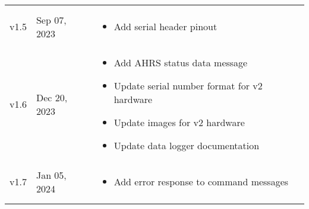 \begin{longtable}{| >{\centering}p{} | p{} | >{\raggedright\arraybackslash}p{} |}
\begin{itemize}
        \end{itemize}\\
        v1.5 & Sep 07, 2023 &
        \begin{itemize}
            \item Add serial header pinout
        \end{itemize}\\
        v1.6 & Dec 20, 2023 &
        \begin{itemize}
            \item Add \acs{AHRS} status data message
            \item Update serial number format for v2 hardware
            \item Update images for v2 hardware
            \item Update data logger documentation
        \end{itemize}\\
        v1.7 & Jan 05, 2024 &
        \begin{itemize}
            \item Add error response to command messages
        \end{itemize}\\
        \arrayrulecolor{gray!50}\hline
    \end{longtable}
\endgroup
